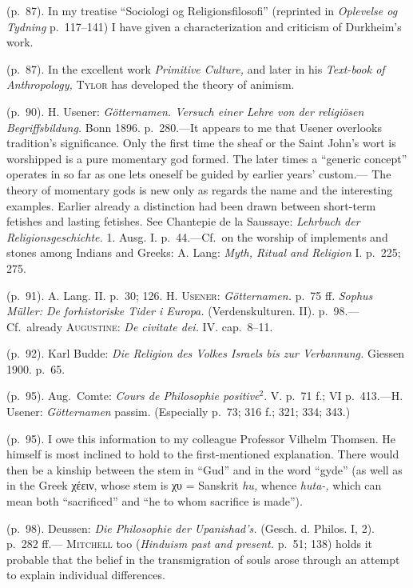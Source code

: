\documentclass[12pt,a4paper]{book}
\begin{document}
 (p.~87). In my treatise ``Sociologi og Religionsfilosofi'' (reprinted in \emph{Oplevelse og
Tydning} p.~117--141) I have given a characterization and criticism of Durkheim's work.

 (p.~87). In the excellent work \emph{Primitive Culture,} and later in his \emph{Text-book of
Anthropology,} \textsc{Tylor} has developed the theory of animism.

 (p.~90). H. Usener: \emph{Götternamen. Versuch einer Lehre von der religiösen Begriffsbildung.}
Bonn 1896. p.~280.---It appears to me that Usener overlooks tradition's significance. Only the first
time the sheaf or the Saint John's wort is worshipped is a pure momentary god formed. The later times
a ``generic concept'' operates in so far as one lets oneself be guided by earlier years' custom.---%
The theory of momentary gods is new only as regards the name and the interesting examples. Earlier
already a distinction had been drawn between short-term fetishes and lasting fetishes. See
Chantepie de la Saussaye: \emph{Lehrbuch der Religionsgeschichte.} 1. Ausg. I. p.~44.---Cf.\ on the
worship of implements and stones among Indians and Greeks: A. Lang: \emph{Myth, Ritual and Religion}
I. p.~225; 275.

 (p.~91). A. Lang. II. p.~30; 126. H. \textsc{Usener}: \emph{Götternamen.} p.~75 ff. \emph{Sophus
Müller: De forhistoriske Tider i Europa.} (Verdenskulturen. II). p.~98.---Cf.\ already
\textsc{Augustine}: \emph{De civitate dei.} IV. cap.~8--11.

 (p.~92). Karl Budde: \emph{Die Religion des Volkes Israels bis zur Verbannung.} Giessen 1900. p.~65.

 (p.~95). Aug.\ Comte: \emph{Cours de Philosophie positive}$^2$. V. p.~71 f.; VI p.~413.---H. Usener:
\emph{Götternamen} passim. (Especially p.~73; 316 f.; 321; 334; 343.)

 (p.~95). I owe this information to my colleague Professor Vilhelm Thomsen. He himself is most
inclined to hold to the first-mentioned explanation. There would then be a kinship between the stem
in ``Gud'' and in the word ``gyde'' (as well as in the Greek χέειν, whose stem is χυ = Sanskrit
\emph{hu,} whence \emph{huta-,} which can mean both ``sacrificed'' and ``he to whom sacrifice is
made'').

 (p.~98). Deussen: \emph{Die Philosophie der Upanishad's.} (Gesch. d. Philos. I, 2). p.~282 ff.---%
\textsc{Mitchell} too (\emph{Hinduism past and present.} p.~51; 138) holds it probable that the
belief in the transmigration of souls arose through an attempt to explain individual differences.
\end{document}
